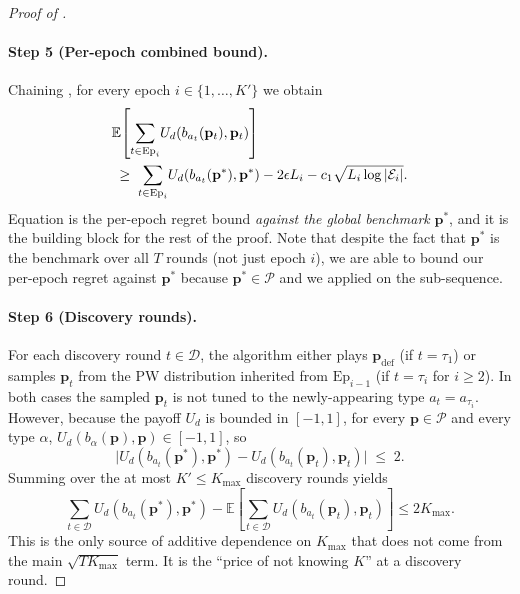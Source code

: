 \documentclass[letterpaper,9pt,twocolumn]{extarticle}
\newcommand{\pvec}{\mathbf{p}}
\newcommand{\cP}{\mathcal{P}}
\newcommand{\cE}{\mathcal{E}}
\newcommand{\EE}{\mathbb{E}}
\newcommand{\Kmax}{K_{\max}}
\theoremstyle{plain}
\theoremstyle{definition}
\theoremstyle{remark}
\begin{document}
\begin{proof}[Proof of ]
\paragraph{Step 5 (Per-epoch combined bound).}
Chaining , for every epoch
$i\in\{1,\dots,K'\}$ we obtain
\begin{align}
&\EE\!\left[\sum_{t\in\mathrm{Ep}_i}\!U_d(b_{a_t}(\pvec_t),\pvec_t)\right]\notag\\
&\;\ge\;\sum_{t\in\mathrm{Ep}_i}\!U_d(b_{a_t}(\pvec^{*}),\pvec^{*})-2\epsilon L_i-c_1\sqrt{L_i\log|\cE_i|}.\label{eq:combined-epoch}
\end{align}
Equation  is the per-epoch regret bound
\emph{against the global benchmark} $\pvec^{*}$, and it is the building
block for the rest of the proof. Note that despite the fact that
$\pvec^{*}$ is the benchmark over all $T$ rounds (not just epoch $i$),
we are able to bound our per-epoch regret against $\pvec^{*}$ because
$\pvec^{*}\in\cP$ and we applied  on the sub-sequence.

\paragraph{Step 6 (Discovery rounds).}
For each discovery round $t\in\mathcal{D}$, the algorithm either plays
$\pvec_{\text{def}}$ (if $t=\tau_1$) or samples $\pvec_t$ from the PW
distribution inherited from $\mathrm{Ep}_{i-1}$ (if $t=\tau_i$ for
$i\ge 2$). In both cases the sampled $\pvec_t$ is not tuned to the
newly-appearing type $a_t=a_{\tau_i}$. However, because the payoff
$U_d$ is bounded in $[-1,1]$, for every $\pvec\in\cP$ and every type
$\alpha$, $U_d(b_\alpha(\pvec),\pvec)\in[-1,1]$, so
\begin{equation}
\bigl|U_d(b_{a_t}(\pvec^{*}),\pvec^{*})-U_d(b_{a_t}(\pvec_t),\pvec_t)\bigr|\;\le\;2.
\label{eq:disc-bound}
\end{equation}
Summing  over the at most $K'\le\Kmax$ discovery rounds
yields
\begin{equation}
\sum_{t\in\mathcal{D}}\!U_d(b_{a_t}(\pvec^{*}),\pvec^{*})-\EE\!\left[\sum_{t\in\mathcal{D}}\!U_d(b_{a_t}(\pvec_t),\pvec_t)\right]\le 2\Kmax.
\label{eq:disc-sum}
\end{equation}
This is the only source of additive dependence on $\Kmax$ that does not
come from the main $\sqrt{T\Kmax}$ term. It is the ``price of not knowing
$K$'' at a discovery round.


\end{proof}
\end{document}
